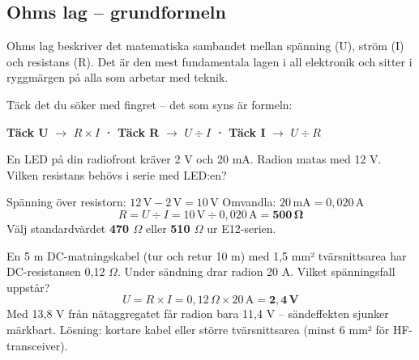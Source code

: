 \documentclass[a4paper,11pt,twoside]{book}
\begin{document}
\subsection{Ohms lag – grundformeln}

Ohms lag beskriver det matematiska sambandet mellan spänning (U), 
ström (I) och resistans (R). Det är den mest fundamentala lagen i 
all elektronik och sitter i ryggmärgen på alla som arbetar med teknik.

Täck det du söker med fingret – det som syns är formeln:

\begin{center}

\medskip
\textbf{Täck U} $\rightarrow$ $R \times I$ \quad\textbf{·}\quad
\textbf{Täck R} $\rightarrow$ $U \div I$ \quad\textbf{·}\quad
\textbf{Täck I} $\rightarrow$ $U \div R$
\end{center}

\begin{worked}[title={Räkneexempel 1.2.1-1 – LED-serieresistor}]
En LED på din radiofront kräver 2 V och 20 mA. Radion matas med 12 V. Vilken resistans behövs i serie med LED:en?

Spänning över resistorn: $12\,\text{V} - 2\,\text{V} = 10\,\text{V}$ \quad Omvandla: $20\,\text{mA} = 0{,}020\,\text{A}$
\[ R = U \div I = 10\,\text{V} \div 0{,}020\,\text{A} = \mathbf{500\,\Omega} \]
Välj standardvärdet \textbf{470 $\Omega$} eller \textbf{510 $\Omega$} ur E12-serien.
\end{worked}

\begin{worked}[title={Räkneexempel 1.2.1-2 – Spänningsfall i DC-matningskabel}]
En 5 m DC-matningskabel (tur och retur 10 m) med 1,5 mm² tvärsnittsarea har DC-resistansen 0,12 $\Omega$. Under sändning drar radion 20 A. Vilket spänningsfall uppstår?
\[ U = R \times I = 0{,}12\,\Omega \times 20\,\text{A} = \mathbf{2{,}4\,\text{V}} \]
Med 13,8 V från nätaggregatet får radion bara 11,4 V – sändeffekten sjunker märkbart. Lösning: kortare kabel eller större tvärsnittsarea (minst 6 mm² för HF-transceiver).
\end{worked}
\end{document}
